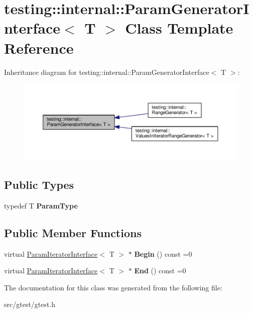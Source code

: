\hypertarget{classtesting_1_1internal_1_1_param_generator_interface}{}\section{testing\+:\+:internal\+:\+:Param\+Generator\+Interface$<$ T $>$ Class Template Reference}
\label{classtesting_1_1internal_1_1_param_generator_interface}


Inheritance diagram for testing\+:\+:internal\+:\+:Param\+Generator\+Interface$<$ T $>$\+:
\nopagebreak
\begin{figure}[H]
\begin{center}
\leavevmode
\includegraphics[width=350pt]{classtesting_1_1internal_1_1_param_generator_interface__inherit__graph}
\end{center}
\end{figure}
\subsection*{Public Types}
\begin{DoxyCompactItemize}
\item 
\mbox{\label{classtesting_1_1internal_1_1_param_generator_interface_ab33d2ea424c50beaf503cb125b3cd003}} 
typedef T {\bfseries Param\+Type}
\end{DoxyCompactItemize}
\subsection*{Public Member Functions}
\begin{DoxyCompactItemize}
\item 
\mbox{\label{classtesting_1_1internal_1_1_param_generator_interface_ae1de83b16fe9a53c67778a026c6a9569}} 
virtual \mbox{\hyperlink{classtesting_1_1internal_1_1_param_iterator_interface}{Param\+Iterator\+Interface}}$<$ T $>$ $\ast$ {\bfseries Begin} () const =0
\item 
\mbox{\label{classtesting_1_1internal_1_1_param_generator_interface_afa7211b74990e11d3fc7ad4e7113da4f}} 
virtual \mbox{\hyperlink{classtesting_1_1internal_1_1_param_iterator_interface}{Param\+Iterator\+Interface}}$<$ T $>$ $\ast$ {\bfseries End} () const =0
\end{DoxyCompactItemize}


The documentation for this class was generated from the following file\+:\begin{DoxyCompactItemize}
\item 
src/gtest/gtest.\+h\end{DoxyCompactItemize}
